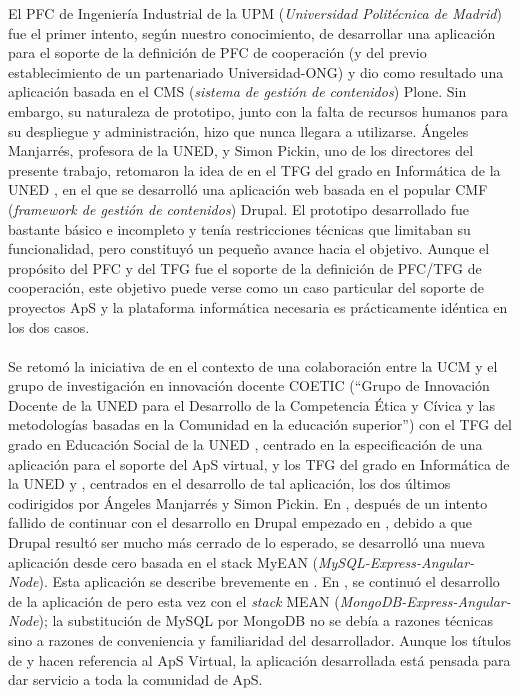 \documentclass[11pt]{book}
\begin{document}
	El PFC de Ingeniería Industrial de la
	UPM (\emph{Universidad Politécnica de Madrid}) \cite{ref1} fue el primer intento, según
	nuestro conocimiento, de desarrollar una aplicación para el soporte de
	la definición de PFC de cooperación (y del previo establecimiento de un
	partenariado Universidad-ONG) y dio como resultado una aplicación basada
	en el CMS (\emph{sistema de gestión de contenidos}) Plone. Sin embargo, su
	naturaleza de prototipo, junto con la falta de recursos humanos para su
	despliegue y administración, hizo que nunca llegara a utilizarse.
	Ángeles Manjarrés, profesora de la UNED, y Simon Pickin, uno de los directores del presente
	trabajo, retomaron la idea de \cite{ref1} en el TFG del grado en Informática de
	la UNED \cite{ref2}, en el que se desarrolló una aplicación web basada en el
	popular CMF (\emph{framework de gestión de contenidos}) Drupal. El prototipo
	desarrollado fue bastante básico e incompleto y tenía restricciones
	técnicas que limitaban su funcionalidad, pero constituyó un pequeño
	avance hacia el objetivo. Aunque el propósito del PFC \cite{ref1} y del TFG \cite{ref2}
	fue el soporte de la definición de PFC/TFG de cooperación, este objetivo
	puede verse como un caso particular del soporte de proyectos ApS y la
	plataforma informática necesaria es prácticamente idéntica en los dos casos.
	\\\\
	Se retomó la iniciativa de \cite{ref2} en el contexto de una colaboración entre
	la UCM y el grupo de investigación en innovación docente COETIC (“Grupo
	de Innovación Docente de la UNED para el Desarrollo de la Competencia
	Ética y Cívica y las metodologías basadas en la Comunidad en la
	educación superior”) con el TFG del grado en Educación Social de la UNED
	\cite{ref3}, centrado en la especificación de una aplicación para el soporte del
	ApS virtual, y los TFG del grado en Informática de la UNED \cite{ref4} y \cite{ref5},
	centrados en el desarrollo de tal aplicación, los dos últimos
	codirigidos por Ángeles Manjarrés y Simon Pickin. En \cite{ref4}, después de un
	intento fallido de continuar con el desarrollo en Drupal empezado en
	\cite{ref3}, debido a que Drupal resultó ser mucho más cerrado de lo esperado,
	se desarrolló una nueva aplicación desde cero basada en el stack MyEAN
	(\emph{MySQL-Express-Angular-Node}). Esta aplicación se describe brevemente en
	\cite{ref6}. En \cite{ref5}, se continuó el desarrollo de la aplicación de \cite{ref4} pero esta
	vez con el \textit{stack} MEAN (\emph{MongoDB-Express-Angular-Node}); la substitución de
	MySQL por MongoDB no se debía a razones técnicas sino a razones de
	conveniencia y familiaridad del desarrollador. Aunque los títulos de \cite{ref4}
	y \cite{ref5} hacen referencia al ApS Virtual, la aplicación desarrollada está
	pensada para dar servicio a toda la comunidad de ApS.
	
\end{document}
